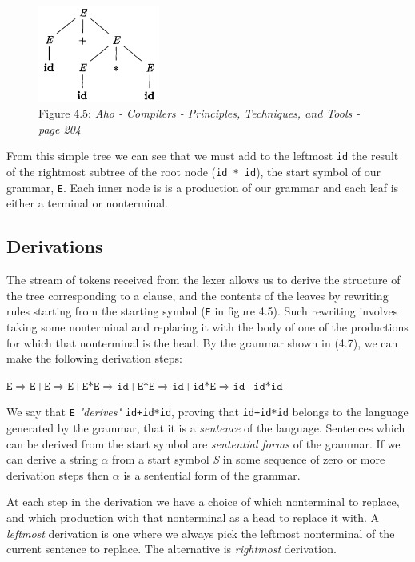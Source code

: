 \documentclass[a4paper, 11pt]{article}
\begin{document}
\begin{figure}[ht!]
	\centering
	\includegraphics[width=40mm]{resource/SyntaxTree.png}
	{\caption*{Figure 4.5: \textit{Aho - Compilers - Principles, Techniques, and Tools - page 204}} 
	\label{overflow}}
\end{figure}

From this simple tree we can see that we must add to the leftmost \texttt{id} the result of the rightmost subtree of the root node (\texttt{id * id}), the start symbol of our grammar, \texttt{E}. Each inner node is is a production of our grammar and each leaf is either a terminal or nonterminal.

\subsection{Derivations}
The stream of tokens received from the lexer allows us to derive the structure of the tree corresponding to a clause, and the contents of the leaves by rewriting rules starting from the starting symbol (\texttt{E} in figure 4.5). Such rewriting involves taking some nonterminal and replacing it with the body of one of the productions for which that nonterminal is the head. By the grammar shown in (4.7), we can make the following derivation steps: 
\begin{center}
$\texttt{E} \Rightarrow \texttt{E+E} \Rightarrow \texttt{E+E*E} \Rightarrow \texttt{id+E*E} \Rightarrow \texttt{id+id*E} \Rightarrow \texttt{id+id*id}$
\end{center}
We say that \texttt{E} \textit{"derives"} \texttt{id+id*id}, proving that \texttt{id+id*id} belongs to the language generated by the grammar, that it is a \textit{sentence} of the language. Sentences which can be derived from the start symbol are \textit{sentential forms} of the grammar. If we can derive a string $\alpha$ from a start symbol \textit{S} in some sequence of zero or more derivation steps then $\alpha$ is a sentential form of the grammar.

At each step in the derivation we have a choice of which nonterminal to replace, and which production with that nonterminal as a head to replace it with. A \textit{leftmost} derivation is one where we always pick the leftmost nonterminal of the current sentence to replace. The alternative is \textit{rightmost} derivation.
\end{document}
